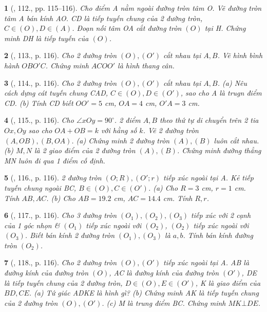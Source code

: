 \documentclass{article}
\newtheorem{baitoan}{}
\begin{document}
\begin{baitoan}[\cite{Binh_Toan_9_tap_1}, 112., pp. 115--116]
	Cho điểm A nằm ngoài đường tròn tâm O. Vẽ đường tròn tâm A bán kính AO. CD là tiếp tuyến chung của 2 đường tròn, $C\in(O),D\in(A)$. Đoạn nối tâm OA cắt đường tròn $(O)$ tại H. Chứng minh DH là tiếp tuyến của $(O)$.
\end{baitoan}

\begin{baitoan}[\cite{Binh_Toan_9_tap_1}, 113., p. 116]
	Cho 2 đường tròn $(O),(O')$ cắt nhau tại $A,B$. Vẽ hình bình hành $OBO'C$. Chứng minh $ACOO'$ là hình thang cân.
\end{baitoan}

\begin{baitoan}[\cite{Binh_Toan_9_tap_1}, 114., p. 116]
	Cho 2 đường tròn $(O),(O')$ cắt nhau tại $A,B$. (a) Nêu cách dựng cát tuyến chung CAD, $C\in(O),D\in(O')$, sao cho A là trugn điểm CD. (b) Tính CD biết $OO' = 5$ {\rm cm}, $OA = 4$ {\rm cm}, $O'A = 3$ {\rm cm}.
\end{baitoan}

\begin{baitoan}[\cite{Binh_Toan_9_tap_1}, 115., p. 116]
	Cho $\angle{xOy} = 90^\circ$. 2 điểm $A,B$ theo thứ tự di chuyển trên 2 tia $Ox,Oy$ sao cho $OA + OB = k$ với hằng số $k$. Vẽ 2 đường tròn $(A,OB),(B,OA)$. (a) Chứng minh 2 đường tròn $(A),(B)$ luôn cắt nhau. (b) $M,N$ là 2 giao điểm của 2 đường tròn $(A),(B)$. Chứng minh đường thẳng MN luôn đi qua 1 điểm cố định.
\end{baitoan}

\begin{baitoan}[\cite{Binh_Toan_9_tap_1}, 116., p. 116]
	2 đường tròn $(O;R),(O';r)$ tiếp xúc ngoài tại A. Kẻ tiếp tuyến chung ngoài BC, $B\in(O),C\in(O')$. (a) Cho $R = 3$ {\rm cm}, $r = 1$ {\rm cm}. Tính $AB,AC$. (b) Cho $AB = 19.2$ {\rm cm}, $AC = 14.4$ {\rm cm}. Tính $R,r$.
\end{baitoan}

\begin{baitoan}[\cite{Binh_Toan_9_tap_1}, 117., p. 116]
	Cho 3 đường tròn $(O_1),(O_2),(O_3)$ tiếp xúc với 2 cạnh của 1 góc nhọn \& $(O_1)$ tiếp xúc ngoài với $(O_2)$, $(O_2)$ tiếp xúc ngoài với $(O_3)$. Biết bán kính 2 đường tròn $(O_1),(O_3)$ là $a,b$. Tính bán kính đường tròn $(O_2)$.
\end{baitoan}

\begin{baitoan}[\cite{Binh_Toan_9_tap_1}, 118., p. 116]
	Cho 2 đường tròn $(O),(O')$ tiếp xúc ngoài tại A. AB là đường kính của đường tròn $(O)$, AC là đường kính của đường tròn $(O')$, DE là tiếp tuyến chung của 2 đường tròn, $D\in(O),E\in(O')$, K là giao điểm của $BD,CE$. (a) Tứ giác ADKE là hình gì? (b) Chứng minh AK là tiếp tuyến chung của 2 đường tròn $(O),(O')$. (c) M là trung điểm BC. Chứng minh $MK\bot DE$.
\end{baitoan}
\end{document}

